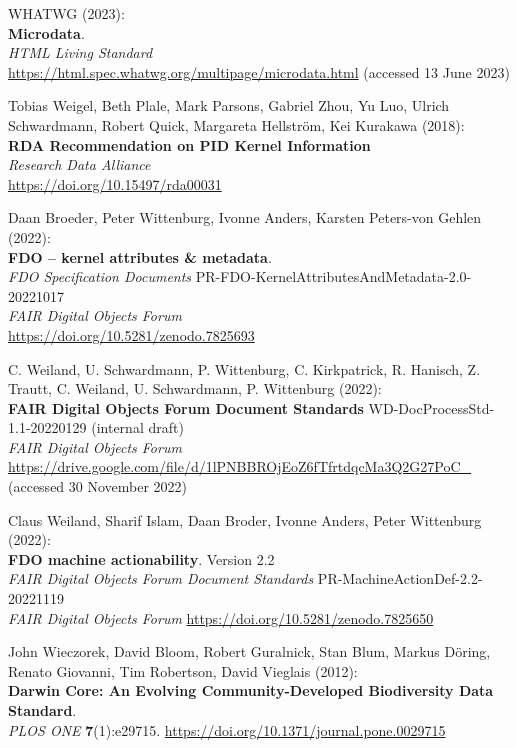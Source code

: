 \begin{thebibliography}{9}
WHATWG (2023): \\
\textbf{Microdata}. \\
\emph{{HTML Living Standard}}\\
\url{https://html.spec.whatwg.org/multipage/microdata.html} (accessed 13
June 2023)


Tobias Weigel, Beth Plale, Mark Parsons, Gabriel Zhou, Yu Luo, Ulrich
Schwardmann, Robert Quick, Margareta Hellström, Kei Kurakawa (2018):\\
\textbf{{RDA Recommendation} on {PID Kernel Information}} \\
\emph{Research Data Alliance}\\
\url{https://doi.org/10.15497/rda00031}

Daan Broeder, Peter Wittenburg, Ivonne Anders, Karsten Peters-von
Gehlen (2022): \\
\textbf{FDO -- kernel attributes \& metadata}.\\ 
\emph{FDO Specification Documents} PR-FDO-KernelAttributesAndMetadata-2.0-20221017 \\
\emph{FAIR Digital Objects Forum}\\
\url{https://doi.org/10.5281/zenodo.7825693}


C. Weiland, U. Schwardmann, P. Wittenburg, C. Kirkpatrick, R. Hanisch,
Z. Trautt, C. Weiland, U. Schwardmann, P. Wittenburg (2022):\\
\textbf{{FAIR Digital Objects Forum Document Standards}} WD-DocProcessStd-1.1-20220129 (internal draft) \\
\emph{FAIR Digital Objects Forum}\\
\url{https://drive.google.com/file/d/1lPNBBROjEoZ6fTfrtdqcMa3Q2G27PoC_}
(accessed 30 November 2022)

Claus Weiland, Sharif Islam, Daan Broder, Ivonne Anders, Peter Wittenburg (2022): \\
\textbf{{FDO} machine actionability}. Version 2.2 \\
\emph{{FAIR Digital Objects Forum Document Standards}} PR-MachineActionDef-2.2-20221119 \\
\emph{FAIR Digital Objects Forum}
\url{https://doi.org/10.5281/zenodo.7825650}

John Wieczorek, David Bloom, Robert Guralnick, Stan Blum, Markus Döring,
Renato Giovanni, Tim Robertson, David Vieglais (2012): \\
\textbf{Darwin {Core}: {An Evolving Community-Developed Biodiversity Data Standard}}.\\
\emph{PLOS ONE} \textbf{7}(1):e29715.
\url{https://doi.org/10.1371/journal.pone.0029715}


\end{thebibliography}
